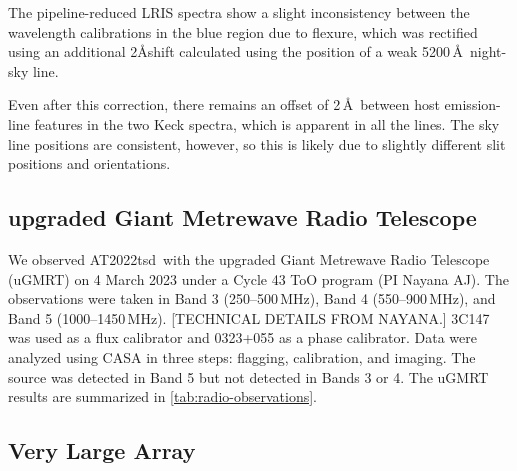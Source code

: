 \documentclass{nature_plusfigure}
\newcommand{\at}{AT2022tsd}
\begin{document}
\begin{methods}
The pipeline-reduced LRIS spectra show a slight inconsistency between the wavelength calibrations in the blue region due to flexure, which was rectified using an additional 2\AA shift calculated using the position of a weak 5200\,\AA\ night-sky line.

Even after this correction, there remains an offset of 2\,\AA\ between host emission-line features in the two Keck spectra, which is apparent in all the lines. The sky line positions are consistent, however, so this is likely due to slightly different slit positions and orientations. 


\subsection{upgraded Giant Metrewave Radio Telescope}
\label{sec:GMRT}

We observed \at\ with the upgraded Giant Metrewave Radio Telescope (uGMRT) on 4 March 2023 under a Cycle 43 ToO program (PI Nayana AJ). The observations were taken in Band 3 (250--500\,MHz), Band 4 (550--900\,MHz), and Band 5 (1000--1450\,MHz). [TECHNICAL DETAILS FROM NAYANA.] 3C147 was used as a flux calibrator and 0323+055 as a phase calibrator. Data were analyzed using CASA in three steps: flagging, calibration, and imaging. 
The source was detected in Band 5 but not detected in Bands 3 or 4.
The uGMRT results are summarized in \ref{tab:radio-observations}.

\subsection{Very Large Array}
\label{Methods:VLA}


\end{methods}
\end{document}
